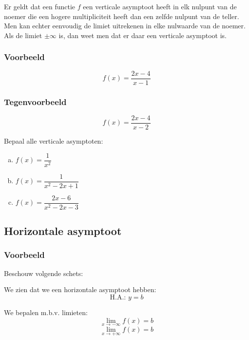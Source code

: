 \documentclass[12pt,twoside,a4paper]{article}
\begin{document}
Er geldt dat een functie $f$ een verticale asymptoot heeft in elk nulpunt van de noemer die een hogere multipliciteit heeft dan een zelfde nulpunt van de teller. Men kan echter eenvoudig de limiet uitrekenen in elke nulwaarde van de noemer. Als de limiet $\pm \infty$ is, dan weet men dat er daar een verticale asymptoot is.

\subsubsection*{Voorbeeld}
$$f(x)=\dfrac{2x-4}{x-1}$$

\subsubsection*{Tegenvoorbeeld}
$$f(x)=\dfrac{2x-4}{x-2}$$

\begin{oefening}
Bepaal alle verticale asymptoten:
\begin{enumerate}[(a)]
  \itemsep.5em
  \item $f(x)=\dfrac{1}{x^2}$
  \item $f(x)=\dfrac{1}{x^2-2x+1}$
  \item $f(x)=\dfrac{2x-6}{x^2-2x-3}$
\end{enumerate}
\end{oefening}

\subsection{Horizontale asymptoot}

\subsubsection*{Voorbeeld}

\begin{minipage}{0.5\textwidth}
Beschouw volgende schets:
\begin{center}
\end{center}
\end{minipage}
\begin{minipage}{0.5\textwidth}
We zien dat we een horizontale asymptoot hebben:
$$\mbox{H.A.: }y=b$$

We bepalen m.b.v. limieten:
$$\lim_{x\to -\infty} f(x)=b$$
$$\lim_{x\to +\infty} f(x)=b$$
\vfill
\end{minipage}
\end{document}
